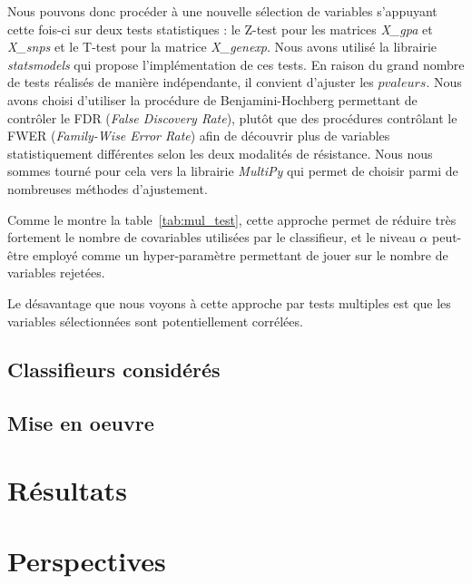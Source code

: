 \documentclass[11pt]{article}
\begin{document}
  Nous pouvons donc procéder à une nouvelle sélection de variables s'appuyant cette fois-ci sur deux tests statistiques : le Z-test pour les matrices \textit{X\_gpa} et \textit{X\_snps} et le T-test pour la matrice \textit{X\_genexp}.
  Nous avons utilisé la librairie \textit{statsmodels} qui propose l'implémentation de ces tests.
  En raison du grand nombre de tests réalisés de manière indépendante, il convient d'ajuster les $pvaleurs$.
  Nous avons choisi d'utiliser la procédure de Benjamini-Hochberg permettant de contrôler le FDR (\textit{False Discovery Rate}), plutôt que des procédures contrôlant le FWER (\textit{Family-Wise Error Rate}) afin de découvrir plus de variables statistiquement différentes selon les deux modalités de résistance.
  Nous nous sommes tourné pour cela vers la librairie \textit{MultiPy} qui permet de choisir parmi de nombreuses méthodes d'ajustement.

  Comme le montre la table~\ref{tab:mul_test}, cette approche permet de réduire très fortement le nombre de covariables utilisées par le classifieur, et le niveau $\alpha$ peut-être employé comme un hyper-paramètre permettant de jouer sur le nombre de variables rejetées.

  

  Le désavantage que nous voyons à cette approche par tests multiples est que les variables sélectionnées sont potentiellement corrélées.

\hypertarget{classifieurs-consideres}{%
\subsection{Classifieurs considérés}\label{classifieurs-consideres}}

\hypertarget{mise-oeuvre}{%
\subsection{Mise en oeuvre}\label{mise-oeuvre}}

\hypertarget{resultats}{%
\section{Résultats}\label{resultats}}

\hypertarget{perspectives}{%
\section{Perspectives}\label{perspectives}}
\end{document}
